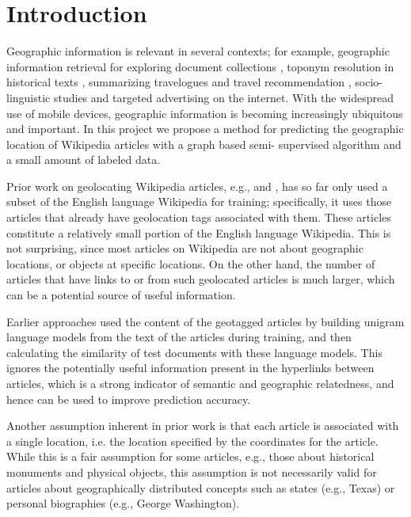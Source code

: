 \section{Introduction}

Geographic information is relevant in several contexts; for example,
geographic information retrieval for exploring document collections
, toponym resolution in historical texts
, summarizing travelogues and travel
recommendation , socio-linguistic studies  and targeted advertising on the internet.  With the widespread
use of mobile devices, geographic information is becoming increasingly
ubiquitous and important.  In this project we propose a method for predicting
the geographic location of Wikipedia articles with a graph based semi-
supervised algorithm and a small amount of labeled data.

\par Prior work on geolocating Wikipedia articles, e.g.,  and  , has so far only used a subset of the
English language Wikipedia for training; specifically, it uses those articles
that already have geolocation tags associated with them.  These articles
constitute a relatively small portion of the English language Wikipedia.
  This is not surprising, since most articles on
Wikipedia are not about geographic locations, or objects at specific
locations. On the other hand, the number of articles that have links to or
from such geolocated articles is much larger, which can be a potential source
of useful information. 

\par Earlier approaches used the content of the geotagged articles by building
unigram language models from the text of the articles during training, and
then calculating the similarity of test documents with these language models.
This ignores the potentially useful information present in the hyperlinks
between articles, which is a strong indicator of semantic and geographic
relatedness, and hence can be used to improve prediction accuracy.

\par Another assumption inherent in prior work is that each article is
associated with a single location, i.e. the location specified by the
coordinates for the article. While this is a fair assumption for some
articles, e.g., those about historical monuments and physical objects, this
assumption is not necessarily valid for articles about geographically
distributed concepts such as states (e.g., Texas) or personal biographies
(e.g., George Washington).

